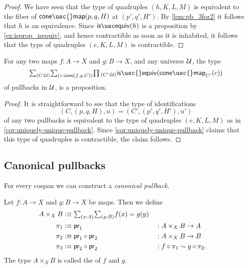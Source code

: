 \begin{proof}
We have seen that the type of quadruples $(h,K,L,M)$ is equivalent to the fiber of $\mathsf{cone\usc{}map}(p,q,H)$ at $(p',q',H')$. By \cref{lem:pb_3for2} it follows that $h$ is an equivalence. Since $\isequiv(h)$ is a proposition by \cref{ex:isprop_isequiv}, and hence contractible as soon as it is inhabited, it follows that the type of quadruples $(e,K,L,M)$ is contractible. 
\end{proof}

\begin{cor}
  For any two maps $f:A\to X$ and $g:B\to X$, and any universe $\mathcal{U}$, the type
  \begin{equation*}
    \sm{C:\UU}{c:\mathsf{cone}(f,g,C)}\prd{C':\UU}\mathsf{is\usc{}equiv}(\mathsf{cone\usc{}map}_{C'}(c))
  \end{equation*}
  of pullbacks in $\mathcal{U}$, is a proposition.
\end{cor}

\begin{proof}
  It is straightforward to see that the type of identifications
  \begin{equation*}
    (C,(p,q,H),u)=(C',(p',q',H'),u')
  \end{equation*}
  of any two pullbacks is equivalent to the type of quadruples $(e,K,L,M)$ as in \cref{cor:uniquely-unique-pullback}. Since \cref{cor:uniquely-unique-pullback} claims that this type of quadruples is contractible, the claim follows.
\end{proof}

\subsection{Canonical pullbacks}

For every cospan we can construct a \emph{canonical pullback}.

\begin{defn}
Let $f:A\to X$ and $g:B\to X$ be maps. Then we define
\begin{align*}
A\times_X B & \defeq \sm{x:A}{y:B}f(x)=g(y) \\
\pi_1 & \defeq \proj 1 & & : A\times_X B\to A \\
\pi_2 & \defeq \proj 1\circ\proj 2 & & : A\times_X B\to B\\
\pi_3 & \defeq \proj 2\circ\proj 2 & & : f\circ \pi_1 \htpy g\circ\pi_2.
\end{align*}
The type $A\times_X B$ is called the  of $f$ and $g$.
\end{defn}

